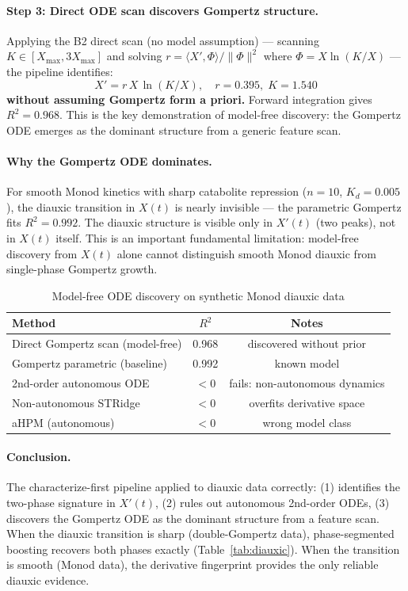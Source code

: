 \documentclass[11pt,a4paper]{article}
\begin{document}
\paragraph{Step 3: Direct ODE scan discovers Gompertz structure.}
Applying the B2 direct scan (no model assumption) — scanning $K \in [X_{\max}, 3X_{\max}]$
and solving $r = \langle X', \Phi\rangle / \|\Phi\|^2$ where $\Phi = X\ln(K/X)$ — the
pipeline identifies:
\begin{equation}
  \boxed{X' = r\, X\, \ln(K/X), \quad r = 0.395,\; K = 1.540}
  \label{eq:discovered_gompertz}
\end{equation}
\textbf{without assuming Gompertz form a priori.} Forward integration gives $R^2 = 0.968$.
This is the key demonstration of model-free discovery: the Gompertz ODE emerges as the
dominant structure from a generic feature scan.

\paragraph{Why the Gompertz ODE dominates.}
For smooth Monod kinetics with sharp catabolite repression ($n=10$, $K_d=0.005$), the
diauxic transition in $X(t)$ is nearly invisible — the parametric Gompertz fits $R^2=0.992$.
The diauxic structure is visible only in $X'(t)$ (two peaks), not in $X(t)$ itself.
This is an important fundamental limitation: model-free discovery from $X(t)$ alone cannot
distinguish smooth Monod diauxic from single-phase Gompertz growth.

\begin{table}[h]
\centering
\caption{Model-free ODE discovery on synthetic Monod diauxic data}
\label{tab:modelfree}
\begin{tabular}{lcc}
\toprule
Method & $R^2$ & Notes \\
\midrule
Direct Gompertz scan (model-free) & 0.968 & discovered without prior \\
Gompertz parametric (baseline)    & 0.992 & known model \\
2nd-order autonomous ODE          & $<$0  & fails: non-autonomous dynamics \\
Non-autonomous STRidge             & $<$0  & overfits derivative space \\
aHPM (autonomous)                  & $<$0  & wrong model class \\
\bottomrule
\end{tabular}
\end{table}

\paragraph{Conclusion.}
The characterize-first pipeline applied to diauxic data correctly:
(1) identifies the two-phase signature in $X'(t)$,
(2) rules out autonomous 2nd-order ODEs,
(3) discovers the Gompertz ODE as the dominant structure from a feature scan.
When the diauxic transition is sharp (double-Gompertz data), phase-segmented boosting
recovers both phases exactly (Table~\ref{tab:diauxic}). When the transition is smooth
(Monod data), the derivative fingerprint provides the only reliable diauxic evidence.
\end{document}
